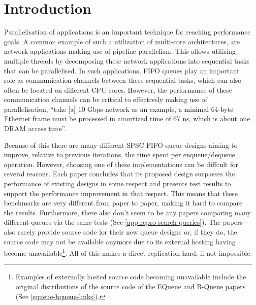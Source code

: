 \chapter{Introduction}
Parallelisation of applications is an important technique for reaching performance goals.
A common example of such a utilization of multi-core architectures, are network applications making use
of pipeline parallelism\cite{Upadhyaya2007,WangCheng2009}.
This allows utilising multiple threads by decomposing these network applications into sequential tasks that can be
parallelised\cite{WangCheng2009}.
In such applications, FIFO queues play an important role as communication channels between these sequential
tasks, which can also often be located on different CPU cores.
However, the performance of these communication channels can be critical to effectively making use of
parallelisation, ``take [a] 10 Gbps network as an example, a minimal 64-byte Ethernet frame must be processed
in amortized time of 67 ns, which is about one DRAM access time''\cite{B-Queue}.

Because of this there are many different SPSC FIFO queue designs aiming to improve, relative to previous
iterations, the time spent per enqueue/dequeue operation\cite{B-Queue,EQueue,FastForward,FastFlowGithub,MCRingBuffer}.
However, choosing one of these implementations can be diffcult for several reasons.
Each paper concludes that its proposed design surpasses the performance of existing designs in some
respect and presents test results to support the performance improvement in that respect.
This means that these benchmarks are very different from paper to paper, making it hard to compare the results.
Furthermore, there also don't seem to be any papers comparing many different queues via the same tests (See
\autoref{app:repro-search-queries}).
The papers also rarely provide source code for their new queue designs or, if they do, the source code may
not be available anymore due to its external hosting having become unavailable\footnote{Examples of externally
    hosted source code becoming unavailable include the original distributions of the source code of the EQueue
and B-Queue papers (See \autoref{equeue-bqueue-links}).}.
All of this makes a direct replication hard, if not impossible\cite{sep-scientific-reproducibility}.

